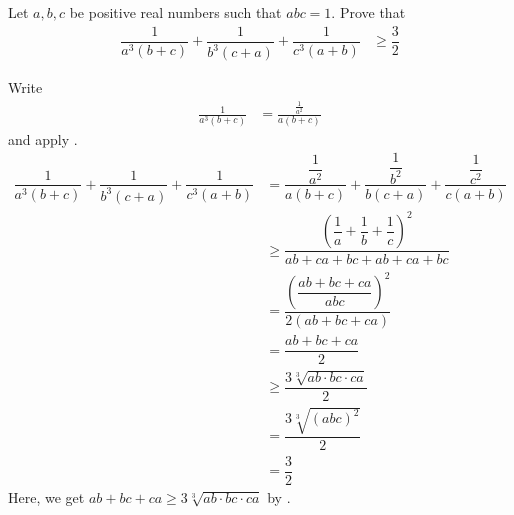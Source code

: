 \documentclass{subfile}
\begin{document}
		\begin{problem}
			Let $a,b,c$ be positive real numbers such that $abc=1$. Prove that
				\begin{align*}
					\dfrac{1}{a^{3}(b+c)}+\dfrac{1}{b^{3}(c+a)}+\dfrac{1}{c^{3}(a+b)}
						& \geq \dfrac{3}{2}
				\end{align*}

				\begin{solution}
					Write
						\begin{align*}
							\frac{1}{a^{3}(b+c)}
								& =\frac{\frac{1}{a^{2}}}{a(b+c)}
						\end{align*}
					and apply .
						\begin{align*}
							\dfrac{1}{a^{3}(b+c)}+\dfrac{1}{b^{3}(c+a)}+\dfrac{1}{c^{3}(a+b)}
								& = \dfrac{\dfrac{1}{a^{2}}}{a(b+c)}+\dfrac{\dfrac{1}{b^{2}}}{b(c+a)}+\dfrac{\dfrac{1}{c^{2}}}{c(a+b)}\\
								& \geq \dfrac{\left(\dfrac{1}{a}+\dfrac{1}{b}+\dfrac{1}{c}\right)^{2}}{ab+ca+bc+ab+ca+bc}\\
								& = \dfrac{\left(\dfrac{ab+bc+ca}{abc}\right)^{2}}{2(ab+bc+ca)}\\
								& = \dfrac{ab+bc+ca}{2}\\
								& \geq \dfrac{3\sqrt[3]{ab\cdot bc\cdot ca}}{2}\\
								& = \dfrac{3\sqrt[3]{(abc)^{2}}}{2}\\
								& = \dfrac{3}{2}
						\end{align*}
					Here, we get $ab+bc+ca\geq3\sqrt[3]{ab\cdot bc\cdot ca}$ by .
				\end{solution}
		\end{problem}
\end{document}
